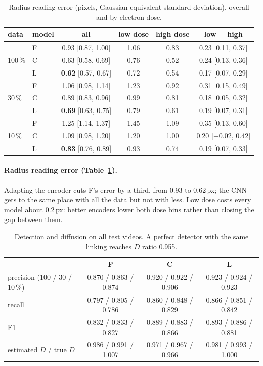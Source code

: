 \documentclass[11pt,a4paper]{article}
\newcommand{\F}{\textsf{F}}
\newcommand{\C}{\textsf{C}}
\newcommand{\Lo}{\textsf{L}}
\begin{document}
\begin{table}[t]
\centering\small
\begin{tabular}{llcccc}
\toprule
data & model & all & low dose & high dose & low $-$ high \\
\midrule
\multirow{3}{*}{100\,\%} & \F{} & 0.93 {\scriptsize[0.87, 1.00]} & 1.06 & 0.83 & 0.23 {\scriptsize[0.11, 0.37]} \\
& \C{} & 0.63 {\scriptsize[0.58, 0.69]} & 0.76 & 0.52 & 0.24 {\scriptsize[0.13, 0.36]} \\
& \Lo{} & \textbf{0.62} {\scriptsize[0.57, 0.67]} & 0.72 & 0.54 & 0.17 {\scriptsize[0.07, 0.29]} \\
\midrule
\multirow{3}{*}{30\,\%} & \F{} & 1.06 {\scriptsize[0.98, 1.14]} & 1.23 & 0.92 & 0.31 {\scriptsize[0.15, 0.49]} \\
& \C{} & 0.89 {\scriptsize[0.83, 0.96]} & 0.99 & 0.81 & 0.18 {\scriptsize[0.05, 0.32]} \\
& \Lo{} & \textbf{0.69} {\scriptsize[0.63, 0.75]} & 0.79 & 0.61 & 0.19 {\scriptsize[0.07, 0.31]} \\
\midrule
\multirow{3}{*}{10\,\%} & \F{} & 1.25 {\scriptsize[1.14, 1.37]} & 1.45 & 1.09 & 0.35 {\scriptsize[0.13, 0.60]} \\
& \C{} & 1.09 {\scriptsize[0.98, 1.20]} & 1.20 & 1.00 & 0.20 {\scriptsize[$-$0.02, 0.42]} \\
& \Lo{} & \textbf{0.83} {\scriptsize[0.76, 0.89]} & 0.93 & 0.74 & 0.19 {\scriptsize[0.07, 0.33]} \\
\bottomrule
\end{tabular}
\caption{Radius reading error (pixels, Gaussian-equivalent standard deviation), overall
and by electron dose.}
\label{tab:sd}
\end{table}

\paragraph{Radius reading error (Table~\ref{tab:sd}).} Adapting the encoder cuts \F{}'s
error by a third, from 0.93 to 0.62\,px; the CNN gets to the same place with all the
data but not with less. Low dose costs every model about 0.2\,px: better encoders lower
both dose bins rather than closing the gap between them.

\begin{table}[t]
\centering\small
\begin{tabular}{lccc}
\toprule
& \F{} & \C{} & \Lo{} \\
\midrule
precision (100 / 30 / 10\,\%) & 0.870 / 0.863 / 0.874 & 0.920 / 0.922 / 0.906 & 0.923 / 0.924 / 0.923 \\
recall & 0.797 / 0.805 / 0.786 & 0.860 / 0.848 / 0.829 & 0.866 / 0.851 / 0.842 \\
F1 & 0.832 / 0.833 / 0.827 & 0.889 / 0.883 / 0.866 & 0.893 / 0.886 / 0.881 \\
estimated $D$ / true $D$ & 0.986 / 0.991 / 1.007 & 0.971 / 0.967 / 0.966 & 0.981 / 0.993 / 1.000 \\
\bottomrule
\end{tabular}
\caption{Detection and diffusion on all test videos. A perfect detector with the same
linking reaches $D$ ratio 0.955.}
\label{tab:det}
\end{table}
\end{document}
